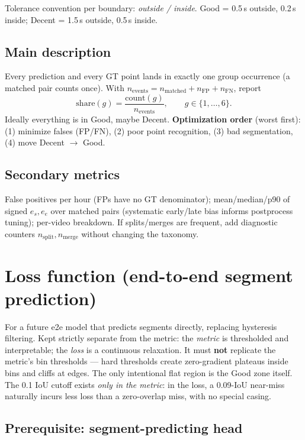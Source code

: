 \documentclass[11pt]{article}
\begin{document}
Tolerance convention per boundary: \emph{outside / inside}. Good = 0.5\,s outside,
0.2\,s inside; Decent = 1.5\,s outside, 0.5\,s inside.

\subsection{Main description}

Every prediction and every GT point lands in exactly one group occurrence (a matched pair
counts once). With $n_{\text{events}} = n_{\text{matched}} + n_{\mathrm{FP}} + n_{\mathrm{FN}}$,
report
\[
\mathrm{share}(g) = \frac{\mathrm{count}(g)}{n_{\text{events}}}, \qquad g \in \{1,\dots,6\}.
\]
Ideally everything is in Good, maybe Decent. \textbf{Optimization order} (worst first):
(1) minimize falses (FP/FN), (2) poor point recognition, (3) bad segmentation,
(4) move Decent $\rightarrow$ Good.

\subsection{Secondary metrics}

False positives per hour (FPs have no GT denominator); mean/median/p90 of signed
$e_s, e_e$ over matched pairs (systematic early/late bias informs postprocess tuning);
per-video breakdown. If splits/merges are frequent, add diagnostic counters
$n_{\text{split}}, n_{\text{merge}}$ without changing the taxonomy.

\section{Loss function (end-to-end segment prediction)}

For a future e2e model that predicts segments directly, replacing hysteresis filtering.
Kept strictly separate from the metric: the \emph{metric} is thresholded and
interpretable; the \emph{loss} is a continuous relaxation. It must \textbf{not} replicate
the metric's bin thresholds --- hard thresholds create zero-gradient plateaus inside bins
and cliffs at edges. The only intentional flat region is the Good zone itself. The 0.1
IoU cutoff exists \emph{only in the metric}: in the loss, a 0.09-IoU near-miss naturally
incurs less loss than a zero-overlap miss, with no special casing.

\subsection{Prerequisite: segment-predicting head}
\end{document}
